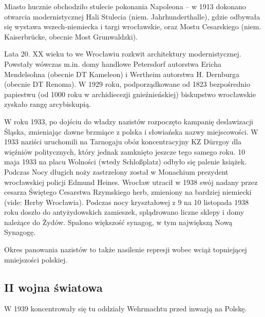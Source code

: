 \documentclass{article}
\begin{document}
\vspace{6pt}

\noindent Miasto hucznie obchodziło stulecie pokonania Napoleona – w 1913 dokonano otwarcia modernistycznej Hali Stulecia (niem. Jahrhunderthalle), gdzie odbywała się wystawa wszech-niemiecka i targi wrocławskie, oraz Mostu Cesarskiego (niem. Kaiserbrücke, obecnie Most Grunwaldzki).

\vspace{6pt}

\noindent Lata 20. XX wieku to we Wrocławiu rozkwit architektury modernistycznej. Powstały wówczas m.in. domy handlowe Petersdorf autorstwa Ericha Mendelsohna (obecnie DT Kameleon) i Wertheim autorstwa H. Dernburga (obecnie DT Renoma). W 1929 roku, podporządkowane od 1823 bezpośrednio papiestwu (od 1000 roku w archidiecezji gnieźnieńskiej) biskupstwo wrocławskie zyskało rangę arcybiskupią.

\vspace{6pt}

\noindent W roku 1933, po dojściu do władzy nazistów rozpoczęto kampanię deslawizacji Śląska, zmieniając dawne brzmiące z polska i słowiańska nazwy miejscowości. W 1933 naziści uruchomili na Tarnogaju obóz koncentracyjny KZ Dürrgoy dla więźniów politycznych, który jednak zamknięto jeszcze tego samego roku. 10 maja 1933 na placu Wolności (wtedy Schloßplatz) odbyło się palenie książek. Podczas Nocy długich noży zastrzelony został w Monachium prezydent wrocławskiej policji Edmund Heines. Wrocław utracił w 1938 swój nadany przez cesarza Świętego Cesarstwa Rzymskiego herb, zmieniony na bardziej niemiecki (vide: Herby Wrocławia). Podczas nocy kryształowej z 9 na 10 listopada 1938 roku doszło do antyżydowskich zamieszek, splądrowano liczne sklepy i domy należące do Żydów. Spalono większość synagog, w tym największą Nową Synagogę.

\vspace{6pt}

\noindent Okres panowania nazistów to także nasilenie represji wobec wciąż topniejącej mniejszości polskiej.

\subsection*{II wojna światowa}
W 1939 koncentrowały się tu oddziały Wehrmachtu przed inwazją na Polskę.

\vspace{6pt}
\end{document}
